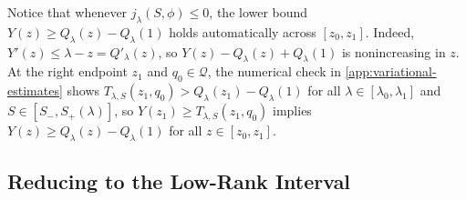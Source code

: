 \documentclass[11pt]{article}
\numberwithin{equation}{section}
\theoremstyle{plain}
\theoremstyle{definition}
\newcommand{\1}{\mathbf{1}}
\newcommand{\calQ}{\mathcal{Q}}
\begin{document}
Notice that whenever $j_\lambda(S, \phi) \le 0$, the lower bound $Y(z) \ge Q_\lambda(z) - Q_\lambda(1)$ holds automatically across $[z_0, z_1]$. Indeed, $Y'(z) \le \lambda - z = Q'_\lambda(z)$, so $Y(z) - Q_\lambda(z) + Q_\lambda(1)$ is nonincreasing in $z$. At the right endpoint $z_1$ and $q_0 \in \calQ$, the numerical check in \cref{app:variational-estimates} shows $T_{\lambda, S}(z_1, q_0) > Q_\lambda(z_1) - Q_\lambda(1)$ for all $\lambda \in [\lambda_0, \lambda_1]$ and $S \in [S_-, S_+(\lambda)]$, so $Y(z_1) \ge T_{\lambda, S}(z_1, q_0)$ implies $Y(z) \ge Q_\lambda(z) - Q_\lambda(1)$ for all $z \in [z_0, z_1]$.

\subsection{Reducing to the Low-Rank Interval}
\label{app:reduction}
\end{document}
